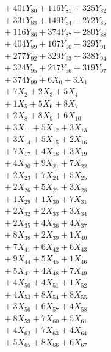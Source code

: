 \documentclass[a4paper,10pt]{article}
\begin{document}
{\begin{align}
&\;  + 401 Y_{80} + 116 Y_{81} + 325 Y_{82} \\[0.3ex]
&\;  + 331 Y_{83} + 149 Y_{84} + 272 Y_{85} \\[0.3ex]
&\;  + 116 Y_{86} + 374 Y_{87} + 280 Y_{88} \\[0.5ex]\allowbreak
&\;  + 404 Y_{89} + 167 Y_{90} + 329 Y_{91} \\[0.3ex]
&\;  + 277 Y_{92} + 329 Y_{93} + 338 Y_{94} \\[0.3ex]
&\;  + 324 Y_{95} + 217 Y_{96} + 319 Y_{97} \\[0.3ex]
&\;  + 374 Y_{99} + 6 X_{0} + 3 X_{1} \\[0.3ex]
&\;  + 7 X_{2} + 2 X_{3} + 5 X_{4} \\[0.3ex]
&\;  + 1 X_{5} + 5 X_{6} + 8 X_{7} \\[0.3ex]
&\;  + 2 X_{8} + 8 X_{9} + 6 X_{10} \\[0.3ex]
&\;  + 3 X_{11} + 5 X_{12} + 3 X_{13} \\[0.3ex]
&\;  + 3 X_{14} + 5 X_{15} + 2 X_{16} \\[0.3ex]
&\;  + 7 X_{17} + 4 X_{18} + 3 X_{19} \\[0.5ex]\allowbreak
&\;  + 4 X_{20} + 9 X_{21} + 7 X_{22} \\[0.3ex]
&\;  + 2 X_{23} + 7 X_{24} + 5 X_{25} \\[0.3ex]
&\;  + 2 X_{26} + 5 X_{27} + 3 X_{28} \\[0.3ex]
&\;  + 1 X_{29} + 1 X_{30} + 7 X_{31} \\[0.3ex]
&\;  + 2 X_{32} + 2 X_{33} + 3 X_{34} \\[0.3ex]
&\;  + 2 X_{35} + 4 X_{36} + 4 X_{37} \\[0.3ex]
&\;  + 8 X_{38} + 2 X_{39} + 1 X_{40} \\[0.3ex]
&\;  + 7 X_{41} + 6 X_{42} + 6 X_{43} \\[0.3ex]
&\;  + 9 X_{44} + 5 X_{45} + 1 X_{46} \\[0.3ex]
&\;  + 5 X_{47} + 4 X_{48} + 7 X_{49} \\[0.5ex]\allowbreak
&\;  + 4 X_{50} + 4 X_{51} + 1 X_{52} \\[0.3ex]
&\;  + 4 X_{53} + 8 X_{54} + 8 X_{55} \\[0.3ex]
&\;  + 3 X_{56} + 6 X_{57} + 4 X_{58} \\[0.3ex]
&\;  + 8 X_{59} + 7 X_{60} + 5 X_{61} \\[0.3ex]
&\;  + 4 X_{62} + 7 X_{63} + 4 X_{64} \\[0.3ex]
&\;  + 5 X_{65} + 8 X_{66} + 6 X_{67} \\[0.3ex]

\end{align}}
\end{document}
